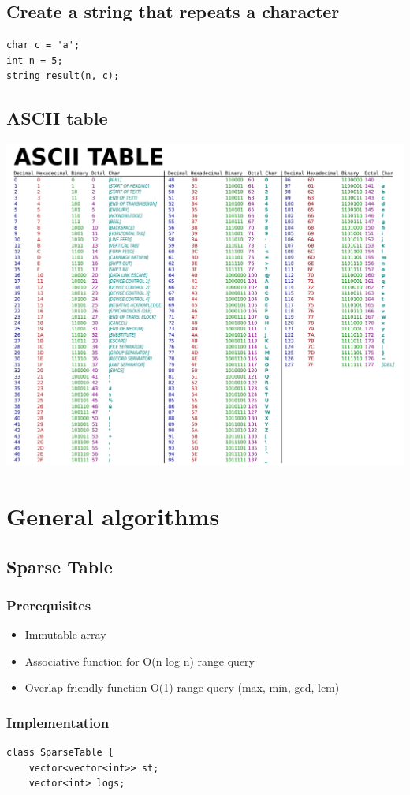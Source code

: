 \documentclass[10pt]{article}
\begin{document}
\begin{multicols*}{2}
\subsection{Create a string that repeats a character}
\begin{lstlisting}[style=compactcpp]
char c = 'a';
int n = 5;
string result(n, c);
\end{lstlisting}

\subsection{ASCII table}
\includegraphics[width=0.8\linewidth]{img/ASCII-Table.png}

\section{General algorithms}
\subsection{Sparse Table}
\subsubsection{Prerequisites}
\begin{itemize}
    \item Immutable array
    \item Associative function for O(n log n) range query
    \item Overlap friendly function O(1) range query (max, min, gcd, lcm)
\end{itemize}

\subsubsection{Implementation}
\begin{lstlisting}[style=compactcpp]
class SparseTable {
    vector<vector<int>> st;
    vector<int> logs;


\end{lstlisting}
\end{multicols*}
\end{document}
